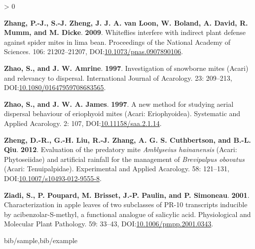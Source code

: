 \documentclass[12pt,final,CPage]{ufthesis}
\newlength{\cslhangindent}
\newenvironment{CSLReferences}[2] %
{%
	\setlength{\parindent}{0pt}
	\ifodd #1 \everypar{\setlength{\hangindent}{\cslhangindent}}\ignorespaces\fi
	\ifnum #2 > 0
	\setlength{\parskip}{#2\baselineskip}
	\fi
}%
{}
\begin{document}
{\begin{CSLReferences}{1}{0}
  \leavevmode{}%
  \textbf{Zhang, P.-J., S.-J. Zheng, J. J. A. van Loon, W. Boland, A. David, R. Mumm, and M. Dicke}. \textbf{2009}. Whiteflies interfere with indirect plant defense against spider mites in lima bean. Proceedings of the National Academy of Sciences. 106: 21202--21207, DOI:\href{https://doi.org/10.1073/pnas.0907890106}{10.1073/pnas.0907890106}.

  \leavevmode{}%
  \textbf{Zhao, S., and J. W. Amrine}. \textbf{1997}. Investigation of snowborne mites ({Acari}) and relevancy to dispersal. International Journal of Acarology. 23: 209--213, DOI:\href{https://doi.org/10.1080/01647959708683565}{10.1080/01647959708683565}.

  \leavevmode{}%
  \textbf{Zhao, S., and J. W. A. James}. \textbf{1997}. A new method for studying aerial dispersal behaviour of eriophyoid mites ({Acari}: {Eriophyoidea}). Systematic and Applied Acarology. 2: 107, DOI:\href{https://doi.org/10.11158/saa.2.1.14}{10.11158/saa.2.1.14}.

  \leavevmode{}%
  \textbf{Zheng, D.-R., G.-H. Liu, R.-J. Zhang, A. G. S. Cuthbertson, and B.-L. Qiu}. \textbf{2012}. Evaluation of the predatory mite {\emph{Amblyseius hainanensis}} ({Acari}: {Phytoseiidae}) and artificial rainfall for the management of {\emph{Brevipalpus obovatus}} ({Acari}: {Tenuipalpidae}). Experimental and Applied Acarology. 58: 121--131, DOI:\href{https://doi.org/10.1007/s10493-012-9555-8}{10.1007/s10493-012-9555-8}.

  \leavevmode{}%
  \textbf{Ziadi, S., P. Poupard, M. Brisset, J.-P. Paulin, and P. Simoneau}. \textbf{2001}. Characterization in apple leaves of two subclasses of {PR}-10 transcripts inducible by acibenzolar-{S}-methyl, a functional analogue of salicylic acid. Physiological and Molecular Plant Pathology. 59: 33--43, DOI:\href{https://doi.org/10.1006/pmpp.2001.0343}{10.1006/pmpp.2001.0343}.

  \end{CSLReferences}
 {bib/sample,bib/example}

\end{document}
